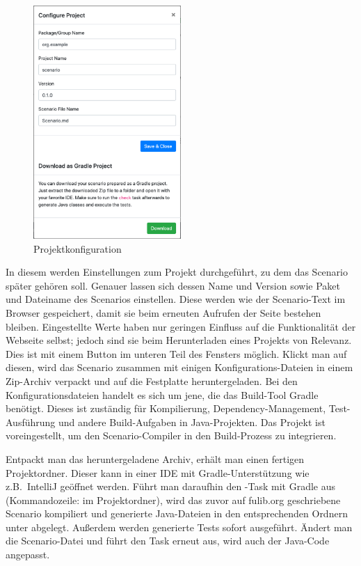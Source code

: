 \begin{figure}
    \centering
    \includegraphics[width=0.5\textwidth]{chapter/fulib.org/img/project-config.png}
    \caption{Projektkonfiguration}
    \label{fig:project-config}
\end{figure}

In diesem werden Einstellungen zum Projekt durchgeführt, zu dem das Scenario später gehören soll.
Genauer lassen sich dessen Name und Version sowie Paket und Dateiname des Scenarios einstellen.
Diese werden wie der Scenario-Text im Browser gespeichert, damit sie beim erneuten Aufrufen der Seite bestehen bleiben.
Eingestellte Werte haben nur geringen Einfluss auf die Funktionalität der Webseite selbst;
jedoch sind sie beim Herunterladen eines Projekts von Relevanz.
Dies ist mit einem Button im unteren Teil des Fensters möglich.
Klickt man auf diesen, wird das Scenario zusammen mit einigen Konfigurations-Dateien in einem Zip-Archiv verpackt und auf die Festplatte heruntergeladen.
Bei den Konfigurationsdateien handelt es sich um jene, die das Build-Tool Gradle~\cite{gradle} benötigt.
Dieses ist zuständig für Kompilierung, Dependency-Management, Test-Ausführung und andere Build-Aufgaben in Java-Projekten.
Das Projekt ist voreingestellt, um den Scenario-Compiler in den Build-Prozess zu integrieren.

Entpackt man das heruntergeladene Archiv, erhält man einen fertigen Projektordner.
Dieser kann in einer IDE mit Gradle-Unterstützung wie z.B.\ IntelliJ geöffnet werden.
Führt man daraufhin den -Task mit Gradle aus (Kommandozeile:  im Projektordner),
wird das zuvor auf fulib.org geschriebene Scenario kompiliert und generierte Java-Dateien in den entsprechenden Ordnern unter  abgelegt.
Außerdem werden generierte Tests sofort ausgeführt.
Ändert man die Scenario-Datei und führt den Task erneut aus, wird auch der Java-Code angepasst.

